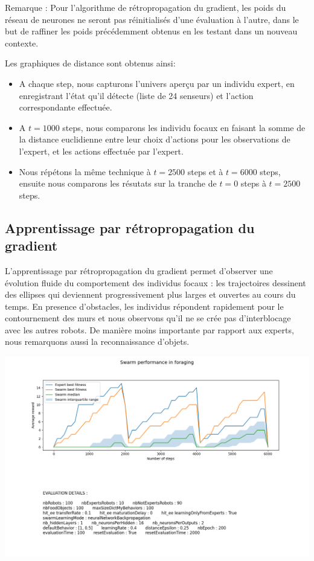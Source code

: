 \documentclass[a4paper, 12pt]{report}
\begin{document}
    Remarque : Pour l'algorithme de rétropropagation du gradient, les poids du réseau de neurones ne seront pas réinitialisés d'une évaluation à l'autre, dans le but de raffiner les poids précédemment obtenus en les testant dans un nouveau contexte.
    
    Les graphiques de distance sont obtenus ainsi:
    \begin{itemize}
        \item A chaque step, nous capturons l'univers aperçu par un individu expert, en enregistrant l'état qu'il détecte (liste de 24 senseurs) et l'action correspondante effectuée.
        \item A $t = 1000$ steps, nous comparons les individu focaux en faisant la somme de la distance euclidienne entre leur choix d'actions pour les observations de l'expert, et les actions effectuée par l'expert.
        \item Nous répétons la même technique à $t = 2500$ steps et à $t = 6000$ steps, ensuite nous comparons les résutats sur la tranche de $t = 0$ steps à $t = 2500$ steps.
    \end{itemize}


	
	
    \subsection{Apprentissage par rétropropagation du gradient}
    L'apprentissage par rétropropagation du gradient permet d'observer une évolution fluide du comportement des individus focaux : les trajectoires dessinent des ellipses qui deviennent progressivement plus larges et ouvertes au cours du temps. En presence d'obstacles, les individus répondent rapidement pour le contournement des murs et nous observons qu'il ne se crée pas d'interblocage avec les autres robots. De manière moins importante par rapport aux experts, nous remarquons aussi la reconnaissance d'objets.
    
    \includegraphics[scale=0.5]{bp6000_100.png}
    
\end{document}
